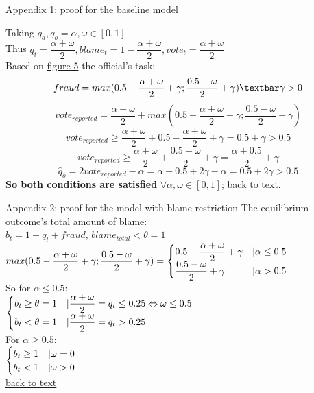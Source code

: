 \documentclass{beamer}
\begin{document}
\begin{frame}{\hypertarget{app1}{Appendix 1: proof for the baseline model}}

    Taking $q_a, q_o = \alpha, \omega \in [0,1]$\\
    Thus $q_t = \dfrac{\alpha+\omega}{2}, blame_t = 1 - \dfrac{\alpha+\omega}{2}, vote_t = \dfrac{\alpha+\omega}{2}$\\
    Based on \hyperlink{fig4}{figure 5} the official's task:    $$fraud = max(0.5 - \dfrac{\alpha+\omega}{2} + \gamma; \dfrac{0.5 - \omega}{2} +\gamma) \textbar \gamma > 0$$
    $$vote_{reported} = \dfrac{\alpha+\omega}{2} + max(0.5 - \dfrac{\alpha+\omega}{2} + \gamma; \dfrac{0.5 - \omega}{2} + \gamma)$$
    $$vote_{reported} \geq \dfrac{\alpha+\omega}{2} + 0.5 - \dfrac{\alpha+\omega}{2} + \gamma = 0.5 + \gamma > 0.5$$ 
    $$vote_{reported} \geq \dfrac{\alpha+\omega}{2} + \dfrac{0.5 - \omega}{2} +\gamma = \dfrac{\alpha + 0.5}{2} + \gamma$$
    $$\hat q_o = 2 vote_{reported} - \alpha = \alpha + 0.5 + 2\gamma - \alpha = 0.5 + 2\gamma > 0.5$$
    \textbf{So both conditions are satisfied} $\forall \alpha, \omega \in [0,1]$; \hyperlink{prestext}{back to text}.
    
    

\end{frame}


\begin{frame}{\hypertarget{app2}{Appendix 2: proof for the model with blame restriction}}
    The equilibrium outcome's total amount of blame:\\ $b_{t} = 1 - q_t + fraud$, $blame_{total} < \theta = 1$\\
    $max(0.5 - \dfrac{\alpha+\omega}{2} + \gamma; \dfrac{0.5 - \omega}{2} +\gamma)= \begin{cases}
        0.5 - \dfrac{\alpha+\omega}{2} + \gamma & \textbar \alpha \leq 0.5 \\ 
        \dfrac{0.5 - \omega}{2} +\gamma & \textbar \alpha > 0.5
    \end{cases}$\\
    So for $\alpha \leq 0.5$:\\
    $\begin{cases}
    b_t \geq \theta = 1 & \textbar  \dfrac{\alpha+\omega}{2} = q_t \leq 0.25 \Leftrightarrow \omega \leq 0.5\\
    b_t < \theta = 1 & \textbar  \dfrac{\alpha+\omega}{2} = q_t > 0.25
    \end{cases}$\\
    For $\alpha \geq 0.5$:\\
    $\begin{cases}
        b_t \geq 1 & \textbar \omega = 0\\
        b_t < 1 & \textbar \omega > 0
    \end{cases}$
    \\\hyperlink{prestext2}{back to text}
\end{frame}
\end{document}
